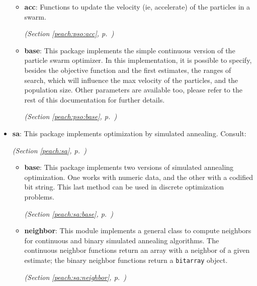 \begin{itemize}
  \begin{itemize}
\setlength{\parskip}{0ex}
    \item \textbf{acc}: 
Functions to update the velocity (ie, accelerate) of the particles in a swarm.


  \textit{(Section \ref{peach:pso:acc}, p.~\pageref{peach:pso:acc})}

    \item \textbf{base}: 
This package implements the simple continuous version of the particle swarm
optimizer. In this implementation, it is possible to specify, besides the
objective function and the first estimates, the ranges of search, which will
influence the max velocity of the particles, and the population size. Other
parameters are available too, please refer to the rest of this documentation for
further details.


  \textit{(Section \ref{peach:pso:base}, p.~\pageref{peach:pso:base})}

  \end{itemize}
\item \textbf{sa}: 
This package implements optimization by simulated annealing. Consult:


  \textit{(Section \ref{peach:sa}, p.~\pageref{peach:sa})}

  \begin{itemize}
\setlength{\parskip}{0ex}
    \item \textbf{base}: 
This package implements two versions of simulated annealing optimization. One
works with numeric data, and the other with a codified bit string. This last
method can be used in discrete optimization problems.


  \textit{(Section \ref{peach:sa:base}, p.~\pageref{peach:sa:base})}

    \item \textbf{neighbor}: 
This module implements a general class to compute neighbors for continuous and
binary simulated annealing algorithms. The continuous neighbor functions return
an array with a neighbor of a given estimate; the binary neighbor functions
return a \texttt{bitarray} object.


  \textit{(Section \ref{peach:sa:neighbor}, p.~\pageref{peach:sa:neighbor})}

  \end{itemize}
\end{itemize}

